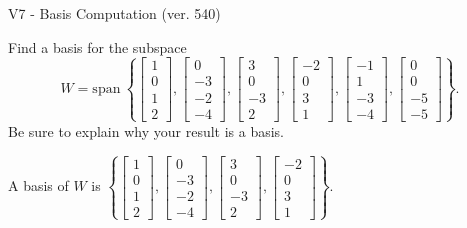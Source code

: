 \begin{exercise}
  \begin{exerciseTitle}V7 - Basis Computation (ver. 540)\end{exerciseTitle}
  \begin{exerciseStatement}
    Find a basis for the subspace 
\[W=\mathrm{span}\ \left\{\left[\begin{array}{r}
1 \\
0 \\
1 \\
2
\end{array}\right] , \left[\begin{array}{r}
0 \\
-3 \\
-2 \\
-4
\end{array}\right] , \left[\begin{array}{r}
3 \\
0 \\
-3 \\
2
\end{array}\right] , \left[\begin{array}{r}
-2 \\
0 \\
3 \\
1
\end{array}\right] , \left[\begin{array}{r}
-1 \\
1 \\
-3 \\
-4
\end{array}\right] , \left[\begin{array}{r}
0 \\
0 \\
-5 \\
-5
\end{array}\right]\right\}.\]
 Be sure to explain why your result is a basis.


  \end{exerciseStatement}
  \begin{exerciseAnswer}
   A basis of \(W\) is  \(\left\{\left[\begin{array}{r}
1 \\
0 \\
1 \\
2
\end{array}\right] , \left[\begin{array}{r}
0 \\
-3 \\
-2 \\
-4
\end{array}\right] , \left[\begin{array}{r}
3 \\
0 \\
-3 \\
2
\end{array}\right] , \left[\begin{array}{r}
-2 \\
0 \\
3 \\
1
\end{array}\right]\right\}\).
  


  \end{exerciseAnswer}
\end{exercise}